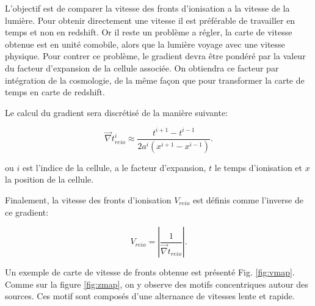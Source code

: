 L'objectif est de comparer la vitesse des fronts d'ionisation a la vitesse de la lumière.
Pour obtenir directement une vitesse il est préférable de travailler en temps et non en redshift.
Or il reste un problème a régler, la carte de vitesse obtenue est en unité comobile, alors que la lumière voyage avec une vitesse physique.
Pour contrer ce problème, le gradient devra être pondéré par la valeur du facteur d'expansion de la cellule associée.
On obtiendra ce facteur par intégration de la cosmologie, de la même façon que pour transformer la carte de temps en carte de redshift.

Le calcul du gradient sera discrétisé de la manière suivante:

\begin{equation}
\vec{\nabla} t_{reio}^i \approx \frac{t^{i+1}  - t^{i-1}}{2a^i \left( x^{i+1}  - x^{i-1} \right)}.
\end{equation}

ou $i$ est l'indice de la cellule, a le facteur d'expansion, $t$ le temps d'ionisation et $x$  la position de la cellule.

Finalement, la vitesse des fronts d'ionisation $V_{reio}$ est définis comme l'inverse de ce gradient:

\begin{equation}
V_{reio}  = \left | \frac{1}{ \vec{\nabla} t_{reio}} \right| .
\end{equation}


Un exemple de carte de vitesse de fronts obtenue est présenté Fig. \ref{fig:vmap}.
Comme sur la figure \ref{fig:zmap}, on y observe  des motifs concentriques autour des sources.
Ces motif sont composés d'une alternance de vitesses lente et rapide.


